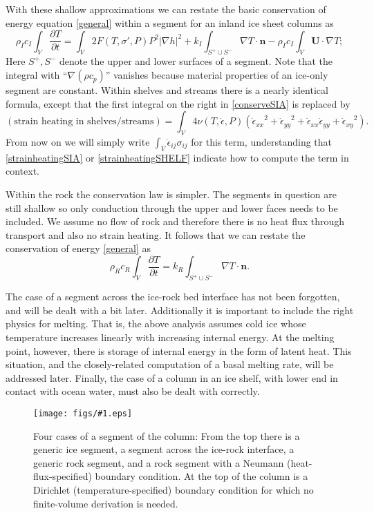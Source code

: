 \documentclass[12pt,final]{amsart}%
\theoremstyle{plain}
\theoremstyle{definition}
\theoremstyle{remark}
\newcommand{\regfigure}[2]{\texttt{[image: figs/\#1.eps]}}
\newcommand{\ddt}[1]{\ensuremath{\frac{\partial #1}{\partial t}}}
\def\eps{\epsilon}
\newcommand{\grad}{\nabla}
\newcommand{\nhat}{\mathbf{n}}
\newcommand{\bU}{{\mathbf{U}}}
\begin{document}
With these shallow approximations we can restate the basic conservation of energy equation \eqref{general} within a segment for an inland ice sheet columns as
\begin{equation}\label{conserveSIA}
\rho_I c_I \int_V \ddt{T} = \int_V 2 F(T,\sigma',P) P^2 |\grad h|^2 + k_I \int_{S^+ \cup S^-} \grad T \cdot \nhat - \rho_I c_I \int_V \bU \cdot \grad T;
\end{equation}
Here $S^+,S^-$ denote the upper and lower surfaces of a segment.  Note that the integral with ``$\grad(\rho c_p)$'' vanishes because material properties of an ice-only segment are constant.  Within shelves and streams there is a nearly identical formula, except that the first integral on the right in \eqref{conserveSIA} is replaced by
\begin{equation*}
(\text{strain heating in shelves/streams}) =  \int_V 4 \nu(T,\dot\eps,P) \left({\dot\eps_{xx}}^2 + {\dot\eps_{yy}}^2 + \dot\eps_{xx} \dot\eps_{yy} + {\dot\eps_{xy}}^2\right).
\end{equation*}
From now on we will simply write $\int_V \dot \eps_{ij} \sigma_{ij}$ for this term, understanding that \eqref{strainheatingSIA} or \eqref{strainheatingSHELF} indicate how to compute the term in context.

Within the rock the conservation law is simpler.  The segments in question are still shallow so only conduction through the upper and lower faces needs to be included.  We assume no flow of rock and therefore there is no heat flux through transport and also no strain heating.  It follows that we can restate the conservation of energy \eqref{general} as
\begin{equation}\label{conserveROCK}
\rho_R c_R \int_V \ddt{T} = k_R \int_{S^+ \cup S^-} \grad T \cdot \nhat.
\end{equation}

The case of a segment across the ice-rock bed interface has not been forgotten, and will be dealt with a bit later.  Additionally it is important to include the right physics for melting.  That is, the above analysis assumes cold ice whose temperature increases linearly with increasing internal energy.  At the melting point, however, there is storage of internal energy in the form of latent heat.  This situation, and the closely-related computation of a basal melting rate, will be addressed later.  Finally, the case of a column in an ice shelf, with lower end in contact with ocean water, must also be dealt with correctly.

\begin{figure}[ht]
\vspace{0.2in}
\regfigure{fourcases}{4.0}
\vspace{0.1in}
\caption{Four cases of a segment of the column: From the top there is a generic ice segment, a segment across the ice-rock interface, a generic rock segment, and a rock segment with a Neumann (heat-flux-specified) boundary condition.  At the top of the column is a Dirichlet (temperature-specified) boundary condition for which no finite-volume derivation is needed.}
\label{fig:segments}
\end{figure}
\end{document}

